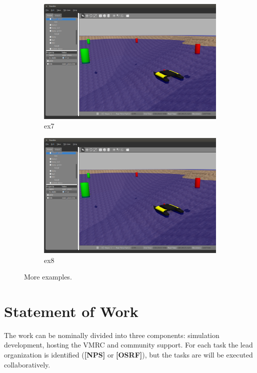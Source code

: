 \documentclass[11pt]{article}
\begin{document}
\begin{figure}[htbp]
\begin{subfigure}[t]{0.65\textwidth}
  \centering
  \includegraphics[width=0.99\linewidth]{example.png}
  \captionsetup{width=0.9\linewidth}
  \caption{ex7}
  \label{f:ex7}
\end{subfigure}
\begin{subfigure}[t]{0.35\textwidth}
  \centering
  \includegraphics[width=0.99\linewidth]{example.png}
  \captionsetup{width=0.9\linewidth}
  \caption{ex8}
  \label{f:ex8}
\end{subfigure}
\caption{More examples.}
\label{f:more_ex}
\end{figure}

\section{Statement of Work}
The work can be nominally divided into three components: simulation development, hosting the VMRC and community support.  For each task the lead organization is identified ({\bf[NPS]} or {\bf[OSRF]}), but the tasks are will be executed collaboratively.
\end{document}
